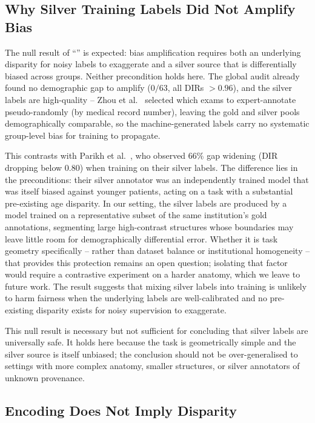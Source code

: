 \subsection{Why Silver Training Labels Did Not Amplify Bias}
\label{sec:no_amplification}

The null result of ``'' is expected: bias amplification
requires both an underlying disparity for noisy labels to exaggerate and a silver
source that is differentially biased across groups. Neither precondition holds
here. The global audit already found no demographic gap to amplify ($0/63$, all
DIRs $> 0.96$), and the silver labels are high-quality -- Zhou et
al.~\cite{zhou2025cspineseg} selected which exams to expert-annotate
pseudo-randomly (by medical record number), leaving the gold and silver pools
demographically comparable, so the machine-generated labels carry no systematic
group-level bias for training to propagate.

This contrasts with Parikh et al.~\cite{parikh2025labelbias}, who observed $66\%$
gap widening (DIR dropping below $0.80$) when training on their silver labels.
The difference lies in the preconditions: their silver annotator was an
independently trained model that was itself biased against younger patients,
acting on a task with a substantial pre-existing age disparity. In our setting,
the silver labels are produced by a model trained on a representative subset of
the same institution's gold annotations, segmenting large high-contrast structures
whose boundaries may leave little room for demographically differential error.
Whether it is task geometry specifically -- rather than dataset balance or
institutional homogeneity -- that provides this protection remains an open
question; isolating that factor would require a contrastive experiment on a harder
anatomy, which we leave to future work. The result suggests that mixing
silver labels into training is unlikely to harm fairness when the underlying
labels are well-calibrated and no pre-existing disparity exists for noisy
supervision to exaggerate.

This null result is necessary but not sufficient for concluding that silver labels
are universally safe. It holds here because the task is geometrically simple and
the silver source is itself unbiased; the conclusion should not be
over-generalised to settings with more complex anatomy, smaller structures, or
silver annotators of unknown provenance.

\subsection{Encoding Does Not Imply Disparity}
\label{sec:encoding_disparity}

